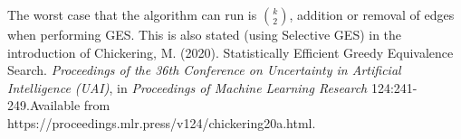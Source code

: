\tftrue

The worst case that the algorithm can run is $\displaystyle{ k \choose 2}$, addition or removal of edges when performing GES. This is also stated (using Selective GES) in the introduction of
Chickering, M. (2020). Statistically Efficient Greedy Equivalence Search. \textit{Proceedings of the 36th Conference on Uncertainty in Artificial Intelligence (UAI)}, in \textit{Proceedings of Machine Learning Research} 124:241-249.Available from\\
https://proceedings.mlr.press/v124/chickering20a.html.

